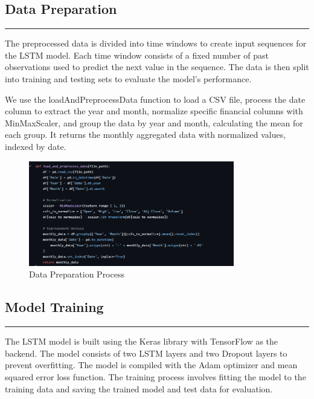 \documentclass{article}
\begin{document}
\subsection{Data Preparation}
\noindent\rule{\textwidth}{1pt} %
The preprocessed data is divided into time windows to create input sequences for the LSTM model. Each time window consists of a fixed number of past observations used to predict the next value in the sequence. The data is then split into training and testing sets to evaluate the model's performance.

We use the loadAndPreprocessData function to load a CSV file, process the date column to extract the year and month, normalize specific financial columns with MinMaxScaler, and group the data by year and month, calculating the mean for each group. It returns the monthly aggregated data with normalized values, indexed by date.

\begin{figure}[h]
    \centering
    \includegraphics[width=0.8\textwidth]{img/Capture d’écran 2025-01-05 200052.png}
    \caption{Data Preparation Process} %
    \label{fig:data-preparation}
\end{figure}

\subsection{Model Training}
\noindent\rule{\textwidth}{1pt} %
The LSTM model is built using the Keras library with TensorFlow as the backend. The model consists of two LSTM layers and two Dropout layers to prevent overfitting. The model is compiled with the Adam optimizer and mean squared error loss function. The training process involves fitting the model to the training data and saving the trained model and test data for evaluation.
\end{document}
